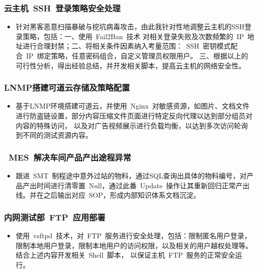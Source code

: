 \documentclass[a4paper,12pt]{article}
\begin{document}
\begin{CJK*}{UTF8}{gbsn}
             \subsubsection*{云主机~SSH~登录策略安全处理}
             \begin{itemize}
                 \item[] 针对黑客恶意扫描暴破与挖坑病毒攻击，由此我针对性地调整云主机的SSH登录策略，包括：一、使用~Fail2Ban~技术
                 对相关登录失败及次数频繁的~IP~地址进行合理封禁；二、将相关条件因素纳入考量范围：~SSH~密钥模式配合~IP~绑定策略，任意密码组合，自定义管理员权限用户。
                 三、根据以上的可行性分析，得出经验总结，并开发相关脚本，提高云主机的网络安全性。
             \end{itemize}

             \subsubsection*{LNMP搭建可道云存储及策略配置}
             \begin{itemize}
                 \item[] 基于LNMP环境搭建可道云，并使用~Nginx~对敏感资源，如图片、文档文件进行防盗链设置，部分内容压缩文件页面进行特定反向代理以达到部分组员对内容的特殊访问，
                以及对广告视频展示进行负载均衡，以达到多次访问轮询到不同的测试资源内容。
             \end{itemize}

             \subsubsection*{~MES~解决车间产品产出途程异常}
             \begin{itemize}
                \item[] 跟进~SMT~制程途中意外过站的物料，通过SQL查询出具体的物料编号，对产品产出时间进行清零置~Null，通过此番~Update~操作让其重新回归正常产出线。并在之后输出对应~SOP，形成内部知识体系文档沉淀。
             \end{itemize}

             \subsubsection*{内网测试部~FTP~应用部署}
             \begin{itemize}
                 \item[] 使用~vsftpd~技术，对~FTP~服务进行安全处理，包括：限制匿名用户登录，
                 限制本地用户登录，限制本地用户的访问权限，以及相关的用户越权处理等。结合上述内容开发相关~Shell~脚本，
                 以保证主机~FTP~服务的正常安全运行。
             \end{itemize}



\end{CJK*}
\end{document}
